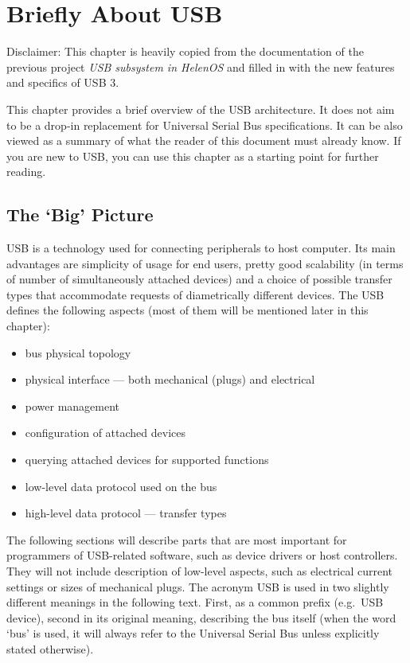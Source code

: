\section{Briefly About USB}
\label{sec:usb_briefly}

Disclaimer: This chapter is heavily copied from the documentation of the
previous project \textit{USB subsystem in HelenOS}\cite{helenos:helusb} and filled in with the new
features and specifics of USB 3.

This chapter provides a brief overview of the USB architecture. It does not aim
to be a drop-in replacement for Universal Serial Bus specifications. It can be
also viewed as a summary of what the reader of this document must already know.
If you are new to USB, you can use this chapter as a starting point for further
reading.

\subsection{The ‘Big’ Picture}

USB is a technology used for connecting peripherals to host computer. Its main
advantages are simplicity of usage for end users, pretty good scalability (in
terms of number of simultaneously attached devices) and a choice of possible
transfer types that accommodate requests of diametrically different devices.
The USB defines the following aspects (most of them will be mentioned later in
this chapter):

\begin{itemize}
\item bus physical topology
\item physical interface — both mechanical (plugs) and electrical
\item power management
\item configuration of attached devices
\item querying attached devices for supported functions
\item low-level data protocol used on the bus
\item high-level data protocol — transfer types
\end{itemize}

The following sections will describe parts that are most important for
programmers of USB-related software, such as device drivers or host
controllers. They will not include description of low-level aspects, such as
electrical current settings or sizes of mechanical plugs. The acronym USB is
used in two slightly different meanings in the following text. First, as a
common prefix (e.g.\ USB device), second in its original meaning, describing the
bus itself (when the word ‘bus’ is used, it will always refer to the Universal
Serial Bus unless explicitly stated otherwise).

